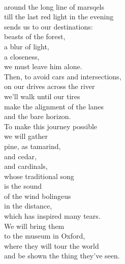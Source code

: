 \documentclass[smalldemyvopaper,11pt,twoside,onecolumn,openright,extrafontsizes]{memoir}
\begin{document}
\\around the long line of marsqels
\\till the last red light in the evening
\\sends us to our destinations:
\\beasts of the forest,
\\a blur of light,
\\a closeness,
\\we must leave him alone.
\\Then, to avoid cars and intersections,
\\on our drives across the river
\\we'll walk until our tires
\\make the alignment of the lanes
\\and the bare horizon.
\\To make this journey possible
\\we will gather
\\pine, as tamarind,
\\and cedar,
\\and cardinals,
\\whose traditional song
\\is the sound
\\of the wind bolingeus
\\in the distance,
\\which has inspired many tears.
\\We will bring them
\\to the museum in Oxford,
\\where they will tour the world
\\and be shown the thing they've seen.
\end{document}
